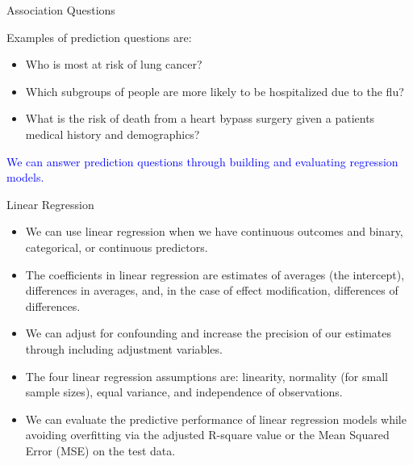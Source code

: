 \documentclass[10pt,t]{beamer}
\begin{document}
\begin{frame}{Association Questions}
	
	Examples of prediction questions are:
	
	\medskip
	
	\begin{itemize}
		\item Who is most at risk of lung cancer?
		
		\medskip
		
		\item Which subgroups of people are more likely to be hospitalized due to the flu?
		
		\medskip
		
		\item What is the risk of death from a heart bypass surgery given a patients medical history and demographics?
	
	\end{itemize}
	
	\medskip
	
	\textcolor{blue}{We can answer prediction questions through building and evaluating regression models.}
	
	
\end{frame}

\begin{frame}{Linear Regression}
	\begin{itemize}
		\item We can use linear regression when we have continuous outcomes and binary, categorical, or continuous predictors.
		
		\medskip
		
		\item The coefficients in linear regression are estimates of averages (the intercept), differences in averages, and, in the case of effect modification, differences of differences.
		
		\medskip
		
		\item We can adjust for confounding and increase the precision of our estimates through including adjustment variables.
		
		\medskip
		
		\item The four linear regression assumptions are: linearity, normality (for small sample sizes), equal variance, and independence of observations.
		
		\medskip
		
		\item We can evaluate the predictive performance of linear regression models while avoiding overfitting via the adjusted R-square value or the Mean Squared Error (MSE) on the test data. 
	\end{itemize}
\end{frame}
\end{document}
